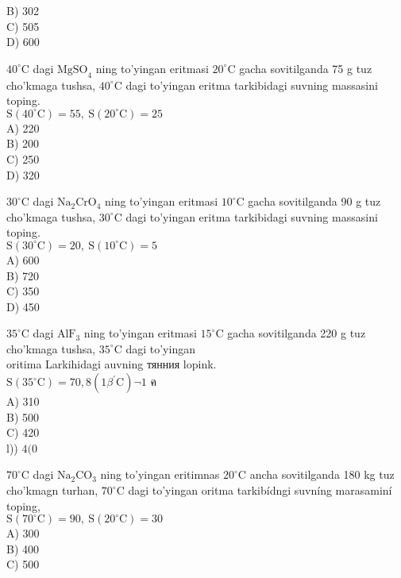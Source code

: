 B) 302\\
C) 505\\
D) 600
  \item $40^{\circ} \mathrm{C}$ dagi $\mathrm{MgSO}_{4}$ ning to'yingan eritmasi $20^{\circ} \mathrm{C}$ gacha sovitilganda 75 g tuz cho'kmaga tushsa, $40^{\circ} \mathrm{C}$ dagi to'yingan eritma tarkibidagi suvning massasini toping.\\
$\mathrm{S}\left(40^{\circ} \mathrm{C}\right)=55, \mathrm{~S}\left(20^{\circ} \mathrm{C}\right)=25$\\
A) 220\\
B) 200\\
C) 250\\
D) 320
  \item $30^{\circ} \mathrm{C}$ dagi $\mathrm{Na}_{2} \mathrm{CrO}_{4}$ ning to'yingan eritmasi $10^{\circ} \mathrm{C}$ gacha sovitilganda 90 g tuz cho'kmaga tushsa, $30^{\circ} \mathrm{C}$ dagi to'yingan eritma tarkibidagi suvning massasini toping.\\
$\mathrm{S}\left(30^{\circ} \mathrm{C}\right)=20, \mathrm{~S}\left(10^{\circ} \mathrm{C}\right)=5$\\
A) 600\\
B) 720\\
C) 350\\
D) 450
  \item $35^{\circ} \mathrm{C}$ dagi $\mathrm{AlF}_{3}$ ning to'yingan eritmasi $15^{\circ} \mathrm{C}$ gacha sovitilganda 220 g tuz cho'kmaga tushsa, $35^{\circ} \mathrm{C}$ dagi to'yingan\\
oritima Larkihidagi auvning тянния lopink.\\
$\mathrm{S}\left(35^{\circ} \mathrm{C}\right)=70,8\left(1 \beta^{\prime} \mathrm{C}\right) \neg 1$ ค\\
A) 310\\
B) 500\\
C) 420\\
l)) $4(0$
  \item $70^{\circ} \mathrm{C}$ dagi $\mathrm{Na}_{2} \mathrm{CO}_{3}$ ning to'yingan eritimnas $20^{\circ} \mathrm{C}$ ancha sovitilganda 180 kg tuz cho'kmagn turhan, $70^{\circ} \mathrm{C}$ dagi to'yingan oritma tarkibídngi suvníng marasaminí toping,\\
$\mathrm{S}\left(70^{\circ} \mathrm{C}\right)=90, \mathrm{~S}\left(20^{\circ} \mathrm{C}\right)=30$\\
A) 300\\
B) 400\\
C) 500\\
